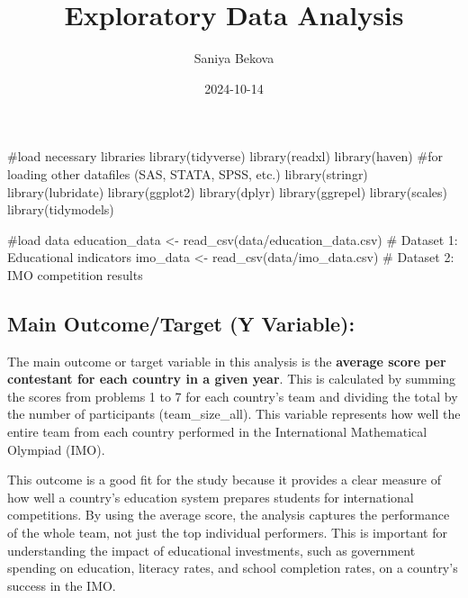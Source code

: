 \documentclass[
  letterpaper,
  DIV=11,
  numbers=noendperiod]{scrartcl}
\title{Exploratory Data Analysis}
\author{Saniya Bekova}
\date{2024-10-14}
\newenvironment{Shaded}{\begin{snugshade}}{\end{snugshade}}
\newcommand{\CommentTok}[1]{\textcolor[rgb]{0.37,0.37,0.37}{#1}}
\newcommand{\FunctionTok}[1]{\textcolor[rgb]{0.28,0.35,0.67}{#1}}
\newcommand{\NormalTok}[1]{\textcolor[rgb]{0.00,0.23,0.31}{#1}}
\newcommand{\OtherTok}[1]{\textcolor[rgb]{0.00,0.23,0.31}{#1}}
\newcommand{\StringTok}[1]{\textcolor[rgb]{0.13,0.47,0.30}{#1}}
\begin{document}
\maketitle

\begin{Shaded}
\begin{Highlighting}[]
\CommentTok{\#load necessary libraries}
\FunctionTok{library}\NormalTok{(tidyverse)}
\FunctionTok{library}\NormalTok{(readxl)}
\FunctionTok{library}\NormalTok{(haven) }\CommentTok{\#for loading other datafiles (SAS, STATA, SPSS, etc.)}
\FunctionTok{library}\NormalTok{(stringr)}
\FunctionTok{library}\NormalTok{(lubridate)}
\FunctionTok{library}\NormalTok{(ggplot2)}
\FunctionTok{library}\NormalTok{(dplyr)}
\FunctionTok{library}\NormalTok{(ggrepel)}
\FunctionTok{library}\NormalTok{(scales)}
\FunctionTok{library}\NormalTok{(tidymodels)}
\end{Highlighting}
\end{Shaded}

\begin{Shaded}
\begin{Highlighting}[]
\CommentTok{\#load data}
\NormalTok{education\_data }\OtherTok{\textless{}{-}} \FunctionTok{read\_csv}\NormalTok{(}\StringTok{\textquotesingle{}data/education\_data.csv\textquotesingle{}}\NormalTok{)  }\CommentTok{\# Dataset 1: Educational indicators}
\NormalTok{imo\_data }\OtherTok{\textless{}{-}} \FunctionTok{read\_csv}\NormalTok{(}\StringTok{\textquotesingle{}data/imo\_data.csv\textquotesingle{}}\NormalTok{)  }\CommentTok{\# Dataset 2: IMO competition results}
\end{Highlighting}
\end{Shaded}

\subsection{Main Outcome/Target (Y
Variable):}\label{main-outcometarget-y-variable}

The main outcome or target variable in this analysis is the
\textbf{average score per contestant for each country in a given year}.
This is calculated by summing the scores from problems 1 to 7 for each
country's team and dividing the total by the number of participants
(team\_size\_all). This variable represents how well the entire team
from each country performed in the International Mathematical Olympiad
(IMO).

This outcome is a good fit for the study because it provides a clear
measure of how well a country's education system prepares students for
international competitions. By using the average score, the analysis
captures the performance of the whole team, not just the top individual
performers. This is important for understanding the impact of
educational investments, such as government spending on education,
literacy rates, and school completion rates, on a country's success in
the IMO.
\end{document}

